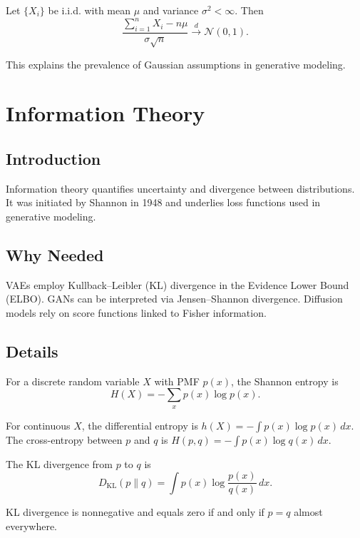 \begin{theorem}
Let $\{X_i\}$ be i.i.d. with mean $\mu$ and variance $\sigma^2<\infty$. Then
\begin{equation}
\frac{\sum_{i=1}^n X_i - n\mu}{\sigma\sqrt{n}} \xrightarrow{d} \mathcal{N}(0,1).
\end{equation}
\end{theorem}
This explains the prevalence of Gaussian assumptions in generative modeling.

\section{Information Theory}
\subsection{Introduction}
Information theory quantifies uncertainty and divergence between distributions. It was initiated by Shannon in 1948 and underlies loss functions used in generative modeling.

\subsection{Why Needed}
VAEs employ Kullback--Leibler (KL) divergence in the Evidence Lower Bound (ELBO). GANs can be interpreted via Jensen--Shannon divergence. Diffusion models rely on score functions linked to Fisher information.

\subsection{Details}
\begin{definition}[Entropy]
For a discrete random variable $X$ with PMF $p(x)$, the Shannon entropy is
\begin{equation}
H(X) = -\sum_x p(x)\log p(x).
\end{equation}
\end{definition}

For continuous $X$, the differential entropy is $h(X)=-\int p(x)\log p(x)\,dx$. The cross-entropy between $p$ and $q$ is $H(p,q)=-\int p(x)\log q(x)\,dx$.

\begin{definition}
The KL divergence from $p$ to $q$ is
\begin{equation}
D_{\mathrm{KL}}(p\|q) = \int p(x) \log \frac{p(x)}{q(x)}\, dx.
\end{equation}
\end{definition}
KL divergence is nonnegative and equals zero if and only if $p=q$ almost everywhere.

